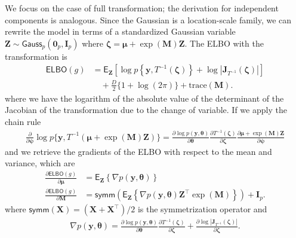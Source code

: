 \documentclass[
  11pt,
  letterpaper,
]{scrbook}
\theoremstyle{definition}
\theoremstyle{plain}
\theoremstyle{plain}
\theoremstyle{plain}
\theoremstyle{definition}
\theoremstyle{definition}
\theoremstyle{plain}
\theoremstyle{plain}
\theoremstyle{remark}
\begin{document}
We focus on the case of full transformation; the derivation for
independent components is analogous. Since the Gaussian is a
location-scale family, we can rewrite the model in terms of a
standardized Gaussian variable
\(\boldsymbol{Z}\sim \mathsf{Gauss}_p(\boldsymbol{0}_p, \mathbf{I}_p)\)
where
\(\boldsymbol{\zeta} = \boldsymbol{\mu} + \exp(\mathbf{M})\boldsymbol{Z}.\)
The ELBO with the transformation is \begin{align*}
 \mathsf{ELBO}(g) & = \mathsf{E}_{\boldsymbol{Z}}\left[ \log p\left\{\boldsymbol{y}, T^{-1}(\boldsymbol{\zeta})\right\} + \log \left|\mathbf{J}_{T^{-1}}(\boldsymbol{\zeta})\right|\right] \\&\quad+\frac{D}{2}\{1+\log(2\pi)\} + \mathrm{trace}(\mathbf{M}).
\end{align*} where we have the logarithm of the absolute value of the
determinant of the Jacobian of the transformation due to the change of
variable. If we apply the chain rule \begin{align*}
 \frac{\partial}{\partial \boldsymbol{\psi}}\log p\{\boldsymbol{y}, T^{-1}(\boldsymbol{\mu} + \exp(\mathbf{M})\boldsymbol{Z})\} = \frac{\partial \log p(\boldsymbol{y}, \boldsymbol{\theta})}{\partial \boldsymbol{\theta}} \frac{\partial T^{-1}(\boldsymbol{\zeta})}{\partial \boldsymbol{\zeta}} \frac{\partial \boldsymbol{\mu} + \exp(\mathbf{M})\boldsymbol{Z}}{\partial \boldsymbol{\psi}}
\end{align*} and we retrieve the gradients of the ELBO with respect to
the mean and variance, which are \begin{align*}
 \frac{\partial \mathsf{ELBO}(g)}{\partial \boldsymbol{\mu}} &= \mathsf{E}_{\boldsymbol{Z}}\left\{\nabla p(\boldsymbol{y}, \boldsymbol{\theta})\right\} \\
 \frac{\partial \mathsf{ELBO}(g)}{\partial \mathbf{M}} &= \mathsf{symm}\left( \mathsf{E}_{\boldsymbol{Z}}\left\{\nabla p(\boldsymbol{y}, \boldsymbol{\theta})\boldsymbol{Z}^\top\exp(\mathbf{M})\right\}\right) + \mathbf{I}_p.
\end{align*} where
\(\mathsf{symm}(\mathbf{X}) = (\mathbf{X} + \mathbf{X}^\top)/2\) is the
symmetrization operator and \begin{align*}
\nabla p(\boldsymbol{y}, \boldsymbol{\theta}) = \frac{\partial \log p(\boldsymbol{y}, \boldsymbol{\theta})}{\partial \boldsymbol{\theta}} \frac{\partial T^{-1}(\boldsymbol{\zeta})}{\partial \boldsymbol{\zeta}}  + \frac{\partial \log \left|\mathbf{J}_{T^{-1}}(\boldsymbol{\zeta})\right|}{\partial \boldsymbol{\zeta}}.
\end{align*}
\end{document}
